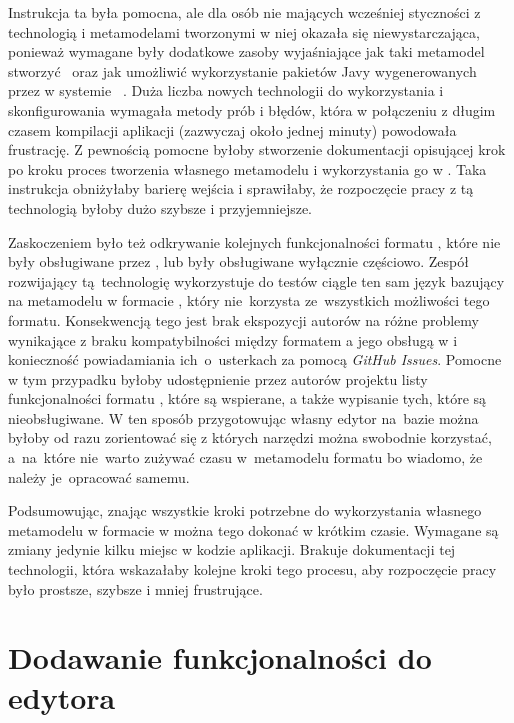 Instrukcja ta była pomocna, ale dla osób nie mających wcześniej styczności z
technologią \EMF{} i metamodelami tworzonymi w niej okazała się
niewystarczająca, ponieważ wymagane były dodatkowe zasoby wyjaśniające jak taki
metamodel stworzyć~\cite{dokumentacja-sirius-desktop,dokumentacja-aql} oraz jak
umożliwić wykorzystanie pakietów Javy wygenerowanych przez \EMF{} w systemie
\Maven{}~\cite{maven-tycho-tutorial}.
Duża liczba nowych technologii do wykorzystania i skonfigurowania wymagała
metody prób i błędów, która w połączeniu z długim czasem kompilacji aplikacji
(zazwyczaj około jednej minuty) powodowała frustrację. Z pewnością pomocne
byłoby
stworzenie dokumentacji opisującej krok po kroku proces tworzenia własnego
metamodelu i wykorzystania go w \SiriusWeb{}. Taka instrukcja obniżyłaby
barierę wejścia i sprawiłaby, że rozpoczęcie pracy z tą technologią byłoby dużo
szybsze i przyjemniejsze.

Zaskoczeniem było też odkrywanie kolejnych funkcjonalności formatu
\Ecore{}, które nie były obsługiwane przez \SiriusWeb{}, lub były
obsługiwane wyłącznie częściowo. Zespół rozwijający tą~technologię wykorzystuje
do testów ciągle ten sam język bazujący na metamodelu w formacie \Ecore{},
który
nie~korzysta ze~wszystkich
możliwości tego formatu. Konsekwencją tego jest brak ekspozycji autorów
\SiriusWeb{} na różne problemy wynikające z braku kompatybilności między
formatem \Ecore{} a jego obsługą w \SiriusWeb{} i
konieczność powiadamiania ich~o~usterkach za pomocą \emph{GitHub Issues}.
Pomocne w tym przypadku byłoby udostępnienie przez autorów projektu listy
funkcjonalności formatu \Ecore{}, które są wspierane, a także wypisanie
tych, które są nieobsługiwane. W ten sposób przygotowując własny edytor
na~bazie
\SiriusWeb{} można byłoby od razu zorientować się z których narzędzi można
swobodnie korzystać, a~na~które nie~warto zużywać czasu w~metamodelu formatu
\Ecore{} bo wiadomo, że należy je~opracować samemu.

Podsumowując, znając wszystkie kroki potrzebne do wykorzystania własnego
metamodelu w formacie \Ecore{} w \SiriusWeb{} można tego dokonać w krótkim
czasie.
Wymagane są zmiany jedynie kilku miejsc w kodzie aplikacji. Brakuje
dokumentacji tej technologii, która wskazałaby kolejne kroki tego
procesu, aby rozpoczęcie pracy było prostsze, szybsze i mniej frustrujące.

\section{Dodawanie funkcjonalności do edytora}

